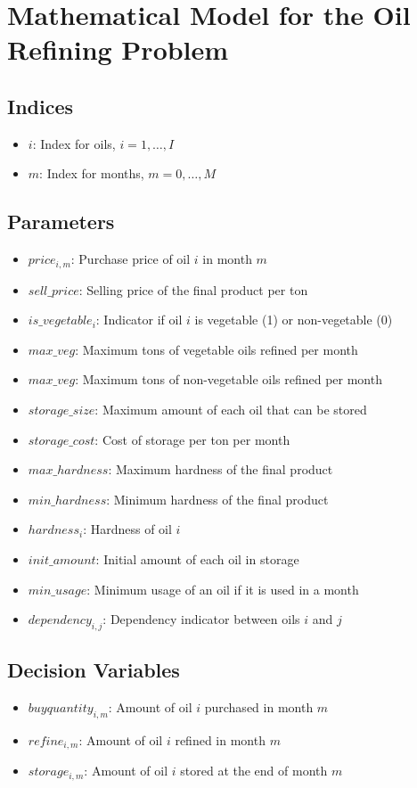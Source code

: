 \documentclass{article}
\begin{document}
\section*{Mathematical Model for the Oil Refining Problem}

\subsection*{Indices}
\begin{itemize}
    \item $i$: Index for oils, $i = 1, \ldots, I$ 
    \item $m$: Index for months, $m = 0, \ldots, M$ 
\end{itemize}

\subsection*{Parameters}
\begin{itemize}
    \item $price_{i,m}$: Purchase price of oil $i$ in month $m$
    \item $sell\_price$: Selling price of the final product per ton
    \item $is\_vegetable_{i}$: Indicator if oil $i$ is vegetable (1) or non-vegetable (0)
    \item $max\_veg$: Maximum tons of vegetable oils refined per month
    \item $max\_veg$: Maximum tons of non-vegetable oils refined per month
    \item $storage\_size$: Maximum amount of each oil that can be stored
    \item $storage\_cost$: Cost of storage per ton per month
    \item $max\_hardness$: Maximum hardness of the final product
    \item $min\_hardness$: Minimum hardness of the final product
    \item $hardness_{i}$: Hardness of oil $i$
    \item $init\_amount$: Initial amount of each oil in storage
    \item $min\_usage$: Minimum usage of an oil if it is used in a month
    \item $dependency_{i,j}$: Dependency indicator between oils $i$ and $j$
\end{itemize}

\subsection*{Decision Variables}
\begin{itemize}
    \item $buyquantity_{i,m}$: Amount of oil $i$ purchased in month $m$
    \item $refine_{i,m}$: Amount of oil $i$ refined in month $m$
    \item $storage_{i,m}$: Amount of oil $i$ stored at the end of month $m$
\end{itemize}
\end{document}
